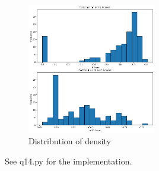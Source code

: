 \documentclass{article}
\begin{document}
\begin{figure}[h!]
    \centering
    \includegraphics[width=0.5\textwidth]{figs/q14.png}
    \caption{Distribution of density}
    \label{fig: q14}
\end{figure}
See q14.py for the implementation.
\end{document}
